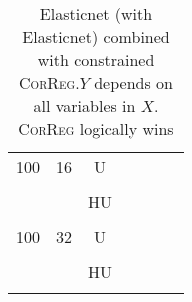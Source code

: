 \documentclass[11pt,a4paper]{article}
\begin{document}
\begin{table}[h!]
\begin{tabular}{|c|c|c|c|c|c|c|}
& & &  \\
\hline %
100 & 16 & U&  \\
& & &  \\
 &  &HU &  \\
& & & \\
\hline %
100 & 32 & U&  \\
& & &  \\
 &  &HU &  \\
& & & \\
\hline
\end{tabular} 
\caption{Elasticnet (with Elasticnet) combined with constrained \textsc{CorReg}.$Y$  depends on all variables in $X$. \textsc{CorReg} logically wins}\label{YXlinenet}
\end{table}
\end{document}
